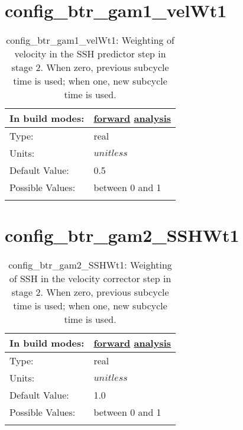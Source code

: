 \section[config\_btr\_gam1\_velWt1]{config\_btr\_gam1\_velWt1}
\label{sec:nm_sec_config_btr_gam1_velWt1}
\begin{center}
\begin{longtable}{| p{2.0in} || p{4.0in} |}
    \hline
    In build modes: & \hyperref[subsec:forward_nm_tab_split_explicit_ts]{forward} \hyperref[subsec:analysis_nm_tab_split_explicit_ts]{analysis} \\
    \hline
    Type: & real \\
    \hline
    Units: & $unitless$ \\
    \hline
    Default Value: & 0.5 \\
    \hline
    Possible Values: & between 0 and 1 \\
    \hline
    \caption{config\_btr\_gam1\_velWt1: Weighting of velocity in the SSH predictor step in stage 2. When zero, previous subcycle time is used; when one, new subcycle time is used.}
\end{longtable}
\end{center}
\section[config\_btr\_gam2\_SSHWt1]{config\_btr\_gam2\_SSHWt1}
\label{sec:nm_sec_config_btr_gam2_SSHWt1}
\begin{center}
\begin{longtable}{| p{2.0in} || p{4.0in} |}
    \hline
    In build modes: & \hyperref[subsec:forward_nm_tab_split_explicit_ts]{forward} \hyperref[subsec:analysis_nm_tab_split_explicit_ts]{analysis} \\
    \hline
    Type: & real \\
    \hline
    Units: & $unitless$ \\
    \hline
    Default Value: & 1.0 \\
    \hline
    Possible Values: & between 0 and 1 \\
    \hline
    \caption{config\_btr\_gam2\_SSHWt1: Weighting of SSH in the velocity corrector step in stage 2. When zero, previous subcycle time is used; when one, new subcycle time is used.}
\end{longtable}
\end{center}
